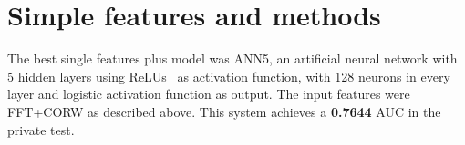 \documentclass[a4paper,english,twoside]{article}
\begin{document}
\section{Simple features and methods}\label{simple-features-and-methods}

The best single features plus model was ANN5, an artificial neural
network with 5 hidden layers using ReLUs~\cite{2011:glorot:aistats}
as activation function, with 128 neurons in every layer and logistic
activation function as output. The input features were FFT+CORW as
described above. This system achieves a \textbf{0.7644} AUC in the
private test.



\end{document}
